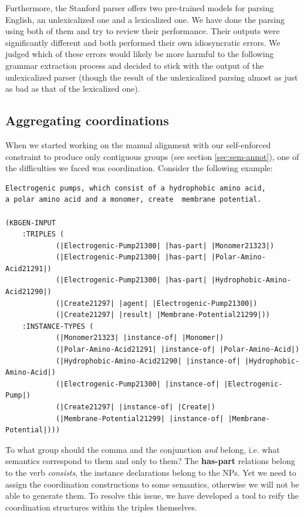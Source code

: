 \documentclass[a4paper]{article}
\begin{document}
Furthermore, the Stanford parser offers two pre-trained models for
parsing English, an unlexicalized one and a lexicalized one. We have
done the parsing using both of them and try to review their
performance. Their outputs were significantly different and both
performed their own idiosyncratic errors. We judged which of these
errors would likely be more harmful to the following grammar
extraction process and decided to stick with the output of the
unlexicalized parser (though the result of the unlexicalized parsing
almost as just as bad as that of the lexicalized one).


\subsection{Aggregating coordinations}
\label{ssec:coord}

When we started working on the manual alignment with our self-enforced
constraint to produce only contiguous groups (see section
\ref{sec:sem-annot}), one of the difficulties we faced was
coordination. Consider the following example:

\begin{verbatim}
Electrogenic pumps, which consist of a hydrophobic amino acid,
a polar amino acid and a monomer, create  membrane potential.

(KBGEN-INPUT 
    :TRIPLES (
            (|Electrogenic-Pump21300| |has-part| |Monomer21323|)
            (|Electrogenic-Pump21300| |has-part| |Polar-Amino-Acid21291|)
            (|Electrogenic-Pump21300| |has-part| |Hydrophobic-Amino-Acid21290|)
            (|Create21297| |agent| |Electrogenic-Pump21300|)
            (|Create21297| |result| |Membrane-Potential21299|))
    :INSTANCE-TYPES (
            (|Monomer21323| |instance-of| |Monomer|)
            (|Polar-Amino-Acid21291| |instance-of| |Polar-Amino-Acid|)
            (|Hydrophobic-Amino-Acid21290| |instance-of| |Hydrophobic-Amino-Acid|)
            (|Electrogenic-Pump21300| |instance-of| |Electrogenic-Pump|)
            (|Create21297| |instance-of| |Create|)
            (|Membrane-Potential21299| |instance-of| |Membrane-Potential|)))
\end{verbatim}

To what group should the comma and the conjunction \emph{and} belong,
i.e. what semantics correspond to them and only to them? The
\textbf{has-part} relations belong to the verb \emph{consists}, the
instance declarations belong to the NPs. Yet we need to assign the
coordination constructions to some semantics, otherwise we will not be
able to generate them. To resolve this issue, we have developed a tool
to reify the coordination structures within the triples themselves.
\end{document}
